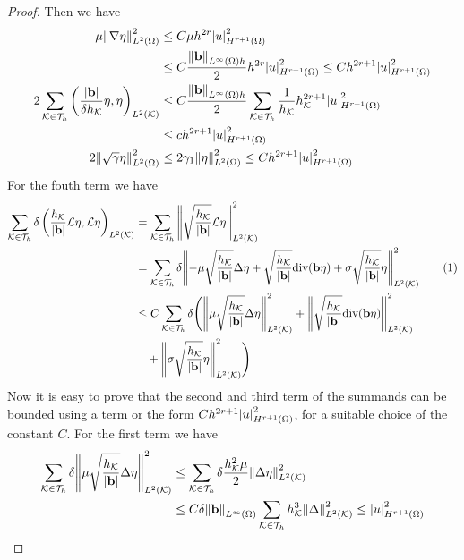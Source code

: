 \begin{proof}
    Then we have 
    \begin{align*}
        \mu \norm{\nabla \eta}_{L^2(\Omega)}^2 &\leq C\mu h^{2r} \abs{u}_{H^{r+1}(\Omega)}^2 \\
        &\leq C\frac{\norm{\textbf{b}}_{L^\infty(\Omega) h}}{2} h^{2r} \abs{u}^2_{H^{r+1}(\Omega)} \leq C h^{2r+1}\abs{u}_{H^{r+1}(\Omega)}^2\\
        2\sum_{\mathcal{K}\in\mathcal{T}_h} \left( \frac{\abs{\textbf{b}}}{\delta h_{\mathcal{K}}} \eta, \eta \right)_{L^2(\mathcal{K})} &\leq  C\frac{\norm{\textbf{b}}_{L^\infty(\Omega) h}}{2} \sum_{\mathcal{K}\in\mathcal{T}_h} \frac{1}{h_{\mathcal{K}}} h^{2r+1}_{\mathcal{K}} \abs{u}^2_{H^{r+1}(\Omega)} \\
        &\leq c h^{2r+1} \abs{u}^2_{H^{r+1}(\Omega)} \\
        2 \norm{\sqrt{\gamma}\eta}_{L^2(\Omega)}^2 &\leq 2\gamma_1 \norm{\eta}_{L^2(\Omega)}^2 \leq Ch^{2r+1} \abs{u}^2_{H^{r+1}(\Omega)} 
    \end{align*} 
    For the fouth term we have 
    \begin{align*}
        \sum_\eit \delta \left( \frac{h_\element}{\vecbabs}\mathcal{L}\eta, \mathcal{L}\eta \right)_{L^2(\element)} &= \sum_\eit \norm{\sqrt{\frac{h_\element}{\vecbabs}} \mathcal{L}\eta}_{L^2(\element)}^2 \\
        &= \sum_\eit \delta \norm{-\mu \sqrt{\frac{h_\element}{\vecbabs}} \Delta \eta + \sqrt{\frac{h_\element}{\vecbabs}} \div(\vect{b}\eta) + \sigma \sqrt{\frac{h_\element}{\vecbabs}} \eta}_{L^2(\element)}^2 \stepcounter{equation}\tag{\theequation}\label{fourth_term_adr}\\
        &\leq C \sum_\eit \delta \Bigg(\norm{\mu \sqrt{\frac{h_\element}{\vecbabs}} \Delta \eta}_{L^2(\element)}^2 + \norm{\sqrt{\frac{h_\element}{\vecbabs}} \div(\vect{b}\eta)}^2_{L^2(\element)} \\
        &\quad + \norm{\sigma \sqrt{\frac{h_\element}{\vecbabs}}\eta}_{L^2(\element)}^2\Bigg) 
    \end{align*}
    Now it is easy to prove that the second and third term of the summands can be bounded using a term or the form \(Ch^{2r+1}\abs{u}_{H^{r+1}(\Omega)}^2\), for a suitable choice of the constant \(C\). For the first term we have 
    \begin{align*}
        \sum_\eit \delta \norm{\mu \sqrt{\frac{h_\element}{\vecbabs}} \Delta \eta}^2_{L^2(\element)} &\leq \sum_\eit \delta \frac{h^2_\element \mu}{2} \norm{\Delta \eta}^2_{L^2(\element)} \\
        &\leq C \delta \norm{\vect{b}}_{L^\infty(\Omega)}\sum_\eit h^3_\element \norm{\Delta}_{L^2(\element)}^2 \leq \abs{u}_{H^{r+1}(\Omega)}^2

\end{align*}
\end{proof}
